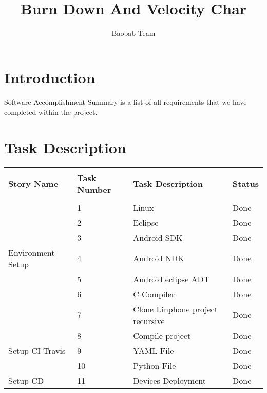 \documentclass[a4paper]{article}
\title{Burn Down And Velocity Char}
\author{Baobab Team}
\begin{document}
\newpage


\newpage

\section{Introduction}
Software Accomplishment Summary is a list of all requirements that we have completed within the project.

\vspace{\baselineskip}

\section{Task Description}
\vspace{\baselineskip}
\begin{table} [H] 
\begin{tabular}{p{3cm} p{3cm} p{3.5cm} p{1cm}} 
\hline %
&&&\\
\textbf{Story Name} & \textbf{Task Number} & \textbf{Task Description} & \textbf{Status}\\ %
&&&\\
\hline

 & 1 & Linux & Done\\ \cmidrule(l){2-4}

 & 2 & Eclipse & Done\\ \cmidrule(l){2-4}

 & 3 & Android SDK & Done \\ \cmidrule(l){2-4}
 
 Environment Setup & 4 & Android NDK & Done \\ \cmidrule(l){2-4}

 & 5 & Android eclipse ADT & Done\\ \cmidrule(l){2-4}

 & 6 & C Compiler & Done\\ \cmidrule(l){2-4}
 
 & 7 & Clone Linphone project recursive & Done \\ \cmidrule(l){2-4}

 & 8 &  Compile project  & Done \\  
\midrule %

 Setup CI Travis & 9 & YAML File & Done \\ \cmidrule(l){2-4}

 & 10 & Python File & Done \\  
 Setup CD & 11 & Devices Deployment & Done \\
\midrule


\end{tabular}
\end{table}
\end{document}

